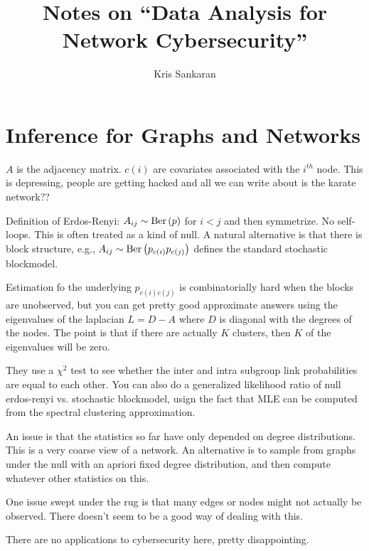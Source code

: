 \documentclass{article}
\title{Notes on ``Data Analysis for Network Cybersecurity''}
\author{Kris Sankaran}
\begin{document}
\section{Inference for Graphs and Networks}
\label{sec:chapter1}

$A$ is the adjacency matrix. $c\left(i\right)$ are covariates associated with
the $i^{th}$ node. This is depressing, people are getting hacked and all we can
write about is the karate network??

Definition of Erdos-Renyi: $A_{ij} \sim \textnormal{Ber}\left(p\right)$ for $i < j$ and then
symmetrize. No self-loops. This is often treated as a kind of null. A natural
alternative is that there is block structure, e.g.,
$A_{ij} \sim \textnormal{Ber}\left(p_{c\left(i\right)}p_{c\left(j\right)}\right)$ defines
the standard stochastic blockmodel.

Estimation fo the underlying $p_{c\left(i\right)c\left(j\right)}$ is
combinatorially hard when the blocks are unobserved, but you can get pretty good
approximate answers using the eigenvalues of the laplacian $L = D - A$ where $D$
is diagonal with the degrees of the nodes. The point is that if there are
actually $K$ clusters, then $K$ of the eigenvalues will be zero.

They use a $\chi^{2}$ test to see whether the inter and intra subgroup link
probabilities are equal to each other. You can also do a generalized likelihood
ratio of null erdos-renyi vs. stochastic blockmodel, usign the fact that MLE can
be computed from the spectral clustering approximation.

An issue is that the statistics so far have only depended on degree
distributions. This is a very coarse view of a network. An alternative is to
sample from graphs under the null with an apriori fixed degree distribution, and
then compute whatever other statistics on this.

One issue swept under the rug is that many edges or nodes might not actually be
observed. There doesn't seem to be a good way of dealing with this.

There are no applications to cybersecurity here, pretty disappointing.
\end{document}

